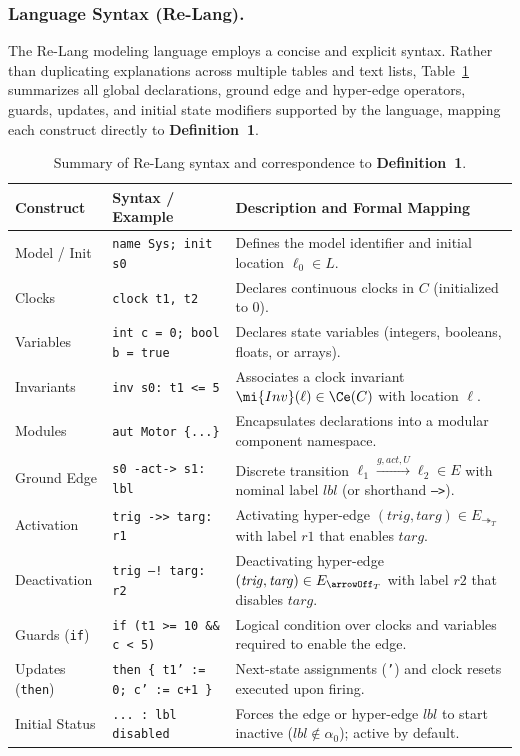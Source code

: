 \subsubsection*{Language Syntax (\textsf{Re-Lang}).}
The \textsf{Re-Lang} modeling language employs a concise and explicit syntax. Rather than duplicating explanations across multiple tables and text lists, Table~\ref{tab:syntax_declarations} summarizes all global declarations, ground edge and hyper-edge operators, guards, updates, and initial state modifiers supported by the language, mapping each construct directly to \textbf{Definition~1}.

\begin{table}[H]
\centering
\caption{Summary of \textsf{Re-Lang} syntax and correspondence to \textbf{Definition~1}.}
\label{tab:syntax_declarations}
\renewcommand{\arraystretch}{1.1}
\setlength{\tabcolsep}{6pt}
\begin{tabularx}{\textwidth}{l l X}
\toprule
\textbf{Construct} & \textbf{Syntax / Example} & \textbf{Description and Formal Mapping} \\ \midrule
Model / Init & \texttt{name Sys; init s0} & Defines the model identifier and initial location $\ell_0 \in L$. \\
Clocks & \texttt{clock t1, t2} & Declares continuous clocks in $C$ (initialized to $0$). \\
Variables & \texttt{int c = 0; bool b = true} & Declares state variables (integers, booleans, floats, or arrays). \\
Invariants & \texttt{inv s0: t1 <= 5} & Associates a clock invariant $\mi{Inv}(\ell) \in \Ce(C)$ with location $\ell$. \\
Modules & \texttt{aut Motor \{...\}} & Encapsulates declarations into a modular component namespace. \\ \midrule
Ground Edge & \texttt{s0 -act-> s1: lbl} & Discrete transition $\ell_1 \xrightarrow{g,\mathit{act},U} \ell_2 \in E$ with nominal label $\mathit{lbl}$ (or shorthand \texttt{-->}). \\
Activation & \texttt{trig ->> targ: r1} & Activating hyper-edge $(\mathit{trig}, \mathit{targ}) \in E_{\twoheadrightarrow_T}$ with label $\mathit{r1}$ that enables $\mathit{targ}$. \\
Deactivation & \texttt{trig --! targ: r2} & Deactivating hyper-edge $(\mathit{trig}, \mathit{targ}) \in E_{\arrowOff_T}$ with label $\mathit{r2}$ that disables $\mathit{targ}$. \\ \midrule
Guards (\texttt{if}) & \texttt{if (t1 >= 10 \&\& c < 5)} & Logical condition over clocks and variables required to enable the edge. \\
Updates (\texttt{then}) & \texttt{then \{ t1' := 0; c' := c+1 \}} & Next-state assignments (\texttt{'}) and clock resets executed upon firing. \\
Initial Status & \texttt{... : lbl disabled} & Forces the edge or hyper-edge $\mathit{lbl}$ to start inactive ($\mathit{lbl} \notin \alpha_0$); active by default. \\ \bottomrule
\end{tabularx}
\end{table}

